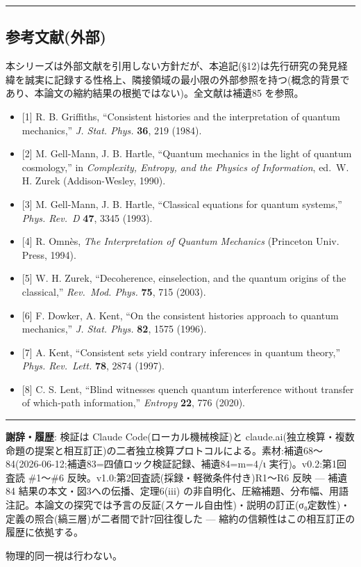 \documentclass[
]{ltjsarticle}
\providecommand{\tightlist}{%
  \setlength{\itemsep}{0pt}\setlength{\parskip}{0pt}}
\begin{document}
\begin{center}\rule{0.5\linewidth}{0.5pt}\end{center}

\subsection{参考文献(外部)}\label{ux53c2ux8003ux6587ux732eux5916ux90e8}

本シリーズは外部文献を引用しない方針だが、本追記(§12)は先行研究の発見経緯を誠実に記録する性格上、隣接領域の最小限の外部参照を持つ(概念的背景であり、本論文の縮約結果の根拠ではない)。全文献は補遺85
を参照。

\begin{itemize}
\tightlist
\item
  {[}1{]} R. B. Griffiths, ``Consistent histories and the interpretation
  of quantum mechanics,'' \emph{J. Stat. Phys.} \textbf{36}, 219 (1984).
\item
  {[}2{]} M. Gell-Mann, J. B. Hartle, ``Quantum mechanics in the light
  of quantum cosmology,'' in \emph{Complexity, Entropy, and the Physics
  of Information}, ed.~W. H. Zurek (Addison-Wesley, 1990).
\item
  {[}3{]} M. Gell-Mann, J. B. Hartle, ``Classical equations for quantum
  systems,'' \emph{Phys. Rev.~D} \textbf{47}, 3345 (1993).
\item
  {[}4{]} R. Omnès, \emph{The Interpretation of Quantum Mechanics}
  (Princeton Univ. Press, 1994).
\item
  {[}5{]} W. H. Zurek, ``Decoherence, einselection, and the quantum
  origins of the classical,'' \emph{Rev.~Mod. Phys.} \textbf{75}, 715
  (2003).
\item
  {[}6{]} F. Dowker, A. Kent, ``On the consistent histories approach to
  quantum mechanics,'' \emph{J. Stat. Phys.} \textbf{82}, 1575 (1996).
\item
  {[}7{]} A. Kent, ``Consistent sets yield contrary inferences in
  quantum theory,'' \emph{Phys. Rev.~Lett.} \textbf{78}, 2874 (1997).
\item
  {[}8{]} C. S. Lent, ``Blind witnesses quench quantum interference
  without transfer of which-path information,'' \emph{Entropy}
  \textbf{22}, 776 (2020).
\end{itemize}

\begin{center}\rule{0.5\linewidth}{0.5pt}\end{center}

\textbf{謝辞・履歴}: 検証は Claude Code(ローカル機械検証)と
claude.ai(独立検算・複数命題の提案と相互訂正)の二者独立検算プロトコルによる。素材:補遺68〜84(2026-06-12;補遺83=四値ロック検証記録、補遺84=m=4/ι
実行)。v0.2:第1回査読 \#1〜\#6
反映。v1.0:第2回査読(採録・軽微条件付き)R1〜R6 反映 --- 補遺84
結果の本文・図3への伝播、定理6(iii)
の非自明化、圧縮補題、分布幅、用語注記。本論文の探究では予言の反証(スケール自由性)・説明の訂正(σ₀定数性)・定義の照合(縞三層)が二者間で計7回往復した
--- 縮約の信頼性はこの相互訂正の履歴に依拠する。

物理的同一視は行わない。
\end{document}
